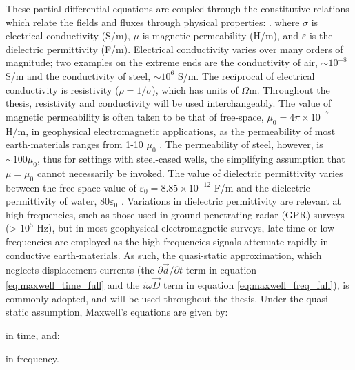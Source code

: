 These partial differential equations are coupled through the constitutive relations which relate the fields and fluxes through physical properties:
.
where $\sigma$ is electrical conductivity (S/m), $\mu$ is magnetic permeability (H/m), and $\varepsilon$ is the dielectric permittivity (F/m). Electrical conductivity varies over many orders of magnitude; two examples on the extreme ends are the conductivity of air, $\sim10^{-8}$ S/m and the conductivity of steel, $\sim 10^6$ S/m. The reciprocal of electrical conductivity is resistivity ($\rho = 1/\sigma$), which has units of $\Omega$m. Throughout the thesis, resistivity and conductivity will be used interchangeably. The value of magnetic permeability is often taken to be that of free-space, $\mu_0 = 4\pi\times10^{-7}$ H/m, in geophysical electromagnetic applications, as the permeability of most earth-materials ranges from 1-10 $\mu_0$ \citep{Telford1990}. The permeability of steel, however, is $\sim 100 \mu_0$, thus for settings with steel-cased wells, the simplifying assumption that $\mu=\mu_0$ cannot necessarily be invoked. The value of dielectric permittivity varies between the free-space value of $\varepsilon_0=8.85\times10^{-12}$ F/m and the dielectric permittivity of water, $80\varepsilon_0$ \citep{Telford1990}. Variations in dielectric permittivity are relevant at high frequencies, such as those used in ground penetrating radar (GPR) surveys (> $10^5$ Hz), but in most geophysical electromagnetic surveys, late-time or low frequencies are employed as the high-frequencies signals attenuate rapidly in conductive earth-materials. As such, the quasi-static approximation, which neglects displacement currents (the $\partial \vec{d} / \partial t$-term in equation \ref{eq:maxwell_time_full} and the $i\omega\vec{D}$ term in equation \ref{eq:maxwell_freq_full}), is commonly adopted, and will be used throughout the thesis. Under the quasi-static assumption, Maxwell’s equations are given by:

in time, and:

 in frequency.

